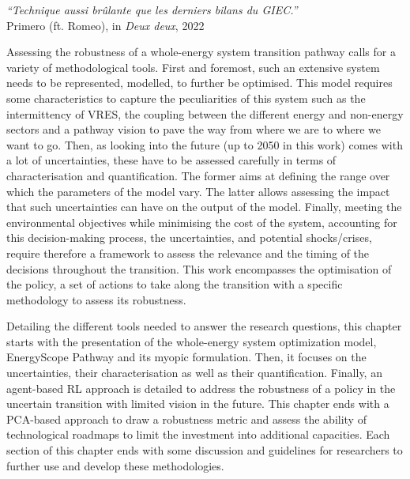 \vspace{-0.2cm}
\begin{flushright}
\emph{``Technique aussi brûlante que les derniers bilans du GIEC.''}\\
 Primero (ft. Romeo), in \textit{Deux deux}, 2022
\end{flushright}
\vspace{0.4cm}
%
%
%

Assessing the robustness of a whole-energy system transition pathway calls for a variety of methodological tools. First and foremost, such an extensive system needs to be represented, \ie modelled, to further be optimised. This model requires some characteristics to capture the peculiarities of this system such as the intermittency of \gls{VRES}, the coupling between the different energy and non-energy sectors and a pathway vision to pave the way from where we are to where we want to go.  Then, as looking into the future (\ie up to 2050 in this work) comes with a lot of uncertainties, these have to be assessed carefully in terms of characterisation and quantification. The former aims at defining the range over which the parameters of the model vary. The latter allows assessing the impact that such uncertainties can have on the output of the model. Finally, meeting the environmental objectives while minimising the cost of the system, accounting for this decision-making process, the uncertainties, and potential shocks/crises, require therefore a framework to assess the relevance and the timing of the decisions throughout the transition. This work encompasses the optimisation of the policy, \ie a set of actions to take along the transition with a specific methodology to assess its robustness. 

Detailing the different tools needed to answer the research questions, this chapter starts with the presentation of the whole-energy system optimization model, EnergyScope Pathway and its myopic formulation. Then, it focuses on the uncertainties, their characterisation as well as their quantification. Finally, an agent-based \acrfull{RL} approach is detailed to address the robustness of a policy in the uncertain transition with limited vision in the future. This chapter ends with a \gls{PCA}-based approach to draw a robustness metric and assess the ability of technological roadmaps to limit the investment into additional capacities. Each section of this chapter ends with some discussion and guidelines for researchers to further use and develop these methodologies.

